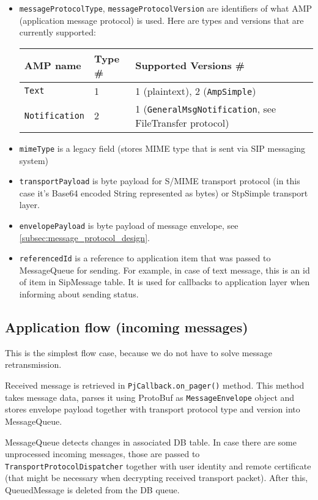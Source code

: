 \documentclass[a4paper,10pt]{article}
\begin{document}
\begin{itemize}
\begin{itemize}
\item \verb#messageProtocolType#, \verb#messageProtocolVersion# are identifiers of what AMP (application message protocol) is used. Here are types and versions that are currently supported:

\begin{tabular}{lll}
AMP name & Type \# & Supported Versions \# \\
\hline
\verb#Text# & 1 & 1 (plaintext), 2 (\verb#AmpSimple#) \\
\verb#Notification# & 2 & 1 (\verb#GeneralMsgNotification#, see FileTransfer protocol)
\end{tabular}
\medskip

\item \verb#mimeType# is a legacy field (stores MIME type that is sent via SIP messaging system)
\item \verb#transportPayload# is byte payload for S/MIME transport protocol (in this case it's Base64 encoded String represented as bytes) or StpSimple transport layer.
\item \verb#envelopePayload# is byte payload of message envelope, see \ref{subsec:message_protocol_design}.
\item \verb#referencedId# is a reference to application item that was passed to MessageQueue for sending. For example, in case of text message, this is an id of item in SipMessage table. It is used for callbacks to application layer when informing about sending status.

\end{itemize}

\end{itemize}
\subsection{Application flow (incoming messages)}
This is the simplest flow case, because we do not have to solve message retransmission.

Received message is retrieved in \verb#PjCallback.on_pager()# method. This method takes message data, parses it using ProtoBuf as \verb#MessageEnvelope# object and stores envelope payload together with transport protocol type and version into MessageQueue. 

MessageQueue detects changes in associated DB table. In case there are some unprocessed incoming messages, those are passed to \verb#TransportProtocolDispatcher# together with user identity and remote certificate (that might be necessary when decrypting received transport packet). After this, QueuedMessage is deleted from the DB queue.
\end{document}
